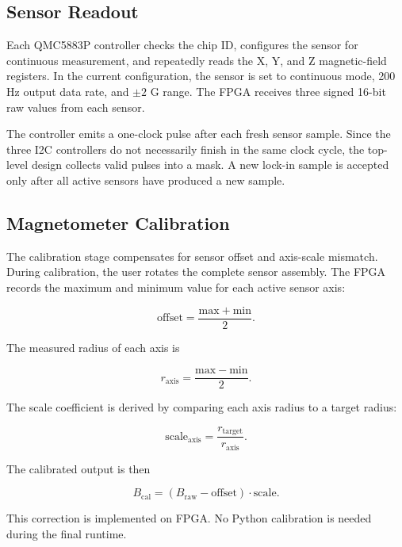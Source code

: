 \subsection{Sensor Readout}

Each QMC5883P controller checks the chip ID, configures the sensor for continuous measurement, and repeatedly reads the X, Y, and Z magnetic-field registers. In the current configuration, the sensor is set to continuous mode, 200 Hz output data rate, and $\pm 2$ G range. The FPGA receives three signed 16-bit raw values from each sensor.

The controller emits a one-clock  pulse after each fresh sensor sample. Since the three I2C controllers do not necessarily finish in the same clock cycle, the top-level design collects valid pulses into a mask. A new lock-in sample is accepted only after all active sensors have produced a new sample.

\subsection{Magnetometer Calibration}

The calibration stage compensates for sensor offset and axis-scale mismatch. During calibration, the user rotates the complete sensor assembly. The FPGA records the maximum and minimum value for each active sensor axis:

\begin{equation}
    \mathrm{offset} = \frac{\mathrm{max} + \mathrm{min}}{2}.
\end{equation}

The measured radius of each axis is

\begin{equation}
    r_{\mathrm{axis}} = \frac{\mathrm{max} - \mathrm{min}}{2}.
\end{equation}

The scale coefficient is derived by comparing each axis radius to a target radius:

\begin{equation}
    \mathrm{scale}_{\mathrm{axis}} =
    \frac{r_{\mathrm{target}}}{r_{\mathrm{axis}}}.
\end{equation}

The calibrated output is then

\begin{equation}
    B_{\mathrm{cal}} = (B_{\mathrm{raw}} - \mathrm{offset}) \cdot \mathrm{scale}.
\end{equation}

This correction is implemented on FPGA. No Python calibration is needed during the final runtime.

